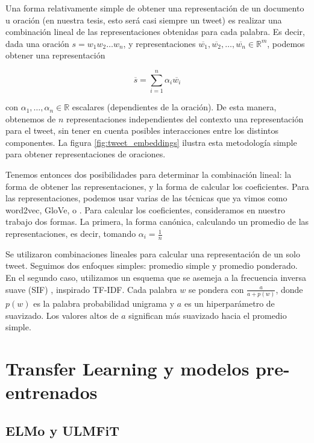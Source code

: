 Una forma relativamente simple de obtener una representación de un documento u oración (en nuestra tesis, esto será casi siempre un tweet) es realizar una combinación lineal de las representaciones obtenidas para cada palabra. Es decir, dada una oración $s = w_1 w_2 \ldots w_n$, y representaciones $\overline{w_1}, \overline{w_2}, \ldots, \overline{w_n} \in \mathbb{R}^m$, podemos obtener una representación

\begin{equation}
    \overline{s} = \sum\limits_{i=1}^{n} \alpha_i \overline{w_i}
\end{equation}

con $\alpha_1, \ldots, \alpha_n \in \mathbb{R}$ escalares (dependientes de la oración). De esta manera, obtenemos de $n$ representaciones independientes del contexto una representación para el tweet, sin tener en cuenta posibles interacciones entre los distintos componentes. La figura \ref{fig:tweet_embeddings} ilustra esta metodología simple para obtener representaciones de oraciones.

Tenemos entonces dos posibilidades para determinar la combinación lineal: la forma de obtener las representaciones, y la forma de calcular los coeficientes. Para las representaciones, podemos usar varias de las técnicas que ya vimos como word2vec, GloVe, o \fasttext{}. Para calcular los coeficientes, consideramos en nuestro trabajo dos formas. La primera, la forma canónica, calculando un promedio de las representaciones, es decir, tomando $\alpha_i = \frac{1}{n}$

Se utilizaron combinaciones lineales para calcular una representación de un solo tweet.
Seguimos dos enfoques simples: promedio simple y promedio ponderado. En el segundo caso, utilizamos un esquema que se asemeja a la frecuencia inversa suave (SIF) \cite{arora17}, inspirado TF-IDF.
Cada palabra $ w $ se pondera con $ \frac {a} {a + p (w)} $, donde $ p (w) $ es la palabra probabilidad unigrama y $ a $ es un hiperparámetro de suavizado.
Los valores altos de $ a $ significan más suavizado hacia el promedio simple.



\section{Transfer Learning y modelos pre-entrenados}

\subsection{ELMo y ULMFiT}
\label{subsec:elmo}

